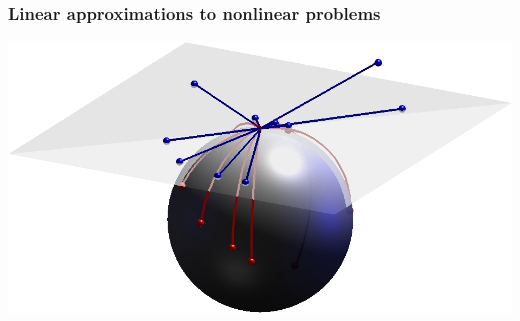 \begin{frame}
\frametitle{Linear approximations to nonlinear problems}
\begin{center}
\includegraphics[width=1.2\textwidth]{spheres}
\end{center}
\end{frame}


